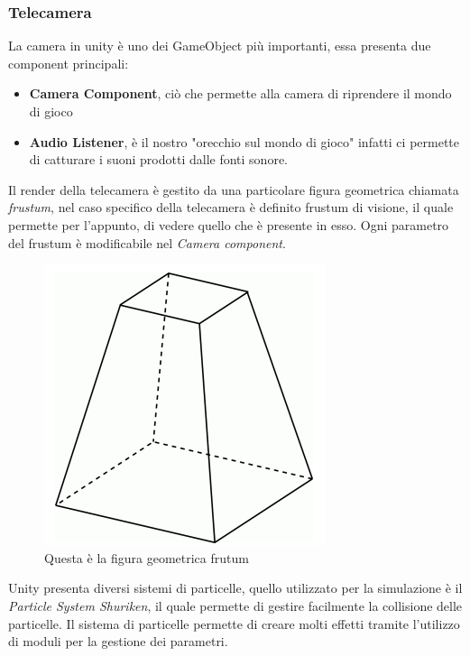 \documentclass[12pt, openany]{book}
\begin{document}
	\subsubsection{Telecamera}
	La camera in unity è uno dei GameObject più importanti, essa presenta due component principali:
	\begin{itemize}
		\item \textbf{Camera Component}, ciò che permette alla camera di riprendere il mondo di gioco
		\item \textbf{Audio Listener}, è il nostro "orecchio sul mondo di gioco" infatti ci permette di catturare i suoni prodotti dalle fonti sonore.
	\end{itemize}
	Il render della telecamera è gestito da una particolare figura geometrica chiamata \emph{frustum}, nel caso specifico della telecamera è definito frustum di visione, il quale permette per l'appunto, di vedere quello che è presente in esso. Ogni parametro del frustum è modificabile nel \emph{Camera component}.
	\begin{figure}[H]
		\centering
		\includegraphics[width=0.5\linewidth]{"Immagini/frustum.png"}
		\caption{Questa è la figura geometrica frutum}
		\label{fig:frustum}
	\end{figure}
		Unity presenta diversi sistemi di particelle, quello utilizzato per la simulazione è il \emph{Particle System Shuriken}, il quale permette di gestire facilmente la collisione delle particelle. Il sistema di particelle permette di creare molti effetti tramite l'utilizzo di moduli per la gestione dei parametri.
\end{document}
